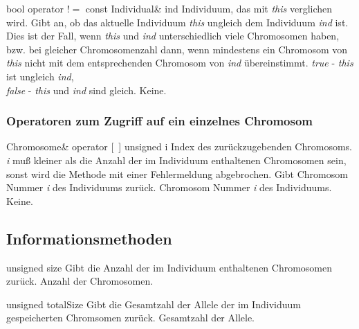 \documentclass{report}
\begin{document}
\newpage

\setConstInstance
\printMethodWithOneParam
{bool}
{operator $!=$}
{const Individual\&}
{ind}
{Individuum, das mit {\em this} verglichen wird.}    
{Gibt an, ob das aktuelle Individuum {\em this}
    ungleich dem Individuum {\em ind} ist. Dies ist der Fall,    
    wenn {\em this} und {\em ind} unterschiedlich viele Chromosomen haben,
    bzw. bei gleicher Chromosomenzahl dann, wenn mindestens ein Chromosom 
    von {\em this} nicht mit dem entsprechenden Chromosom von {\em ind}
    \"ubereinstimmt.}
{
 {\em true}  - {\em this} ist ungleich {\em ind},\\
 {\em false} - {\em this} und {\em ind} sind gleich.}
{Keine.}

\subsubsection{Operatoren zum Zugriff auf ein einzelnes Chromosom}

\setNormalInstance
\printMethodWithOneParam
{Chromosome\&}
{operator [\ ]}
{unsigned}
{i}
{Index des zur\"uckzugebenden Chromosoms. {\em i} mu{\ss}
                        kleiner als die Anzahl der im Individuum
                        enthaltenen Chromosomen sein, sonst wird die
Methode mit einer Fehlermeldung abgebrochen.}
{Gibt Chromosom Nummer {\em i} des Individuums zur\"uck.}
{Chromosom Nummer {\em i} des Individuums.}
{Keine.}

\newpage

\subsection{Informationsmethoden}

\setConstInstance
\printEmptyMethodReturn
{unsigned}
{size}
{Gibt die Anzahl der im Individuum enthaltenen Chromosomen zur\"uck.}
{Anzahl der Chromosomen.}

\vspace{4ex}

\setConstInstance
\printEmptyMethodReturn
{unsigned}
{totalSize}
{Gibt die Gesamtzahl der Allele der im Individuum gespeicherten Chromsomen
    zur\"uck.}
{Gesamtzahl der Allele.}
\end{document}
